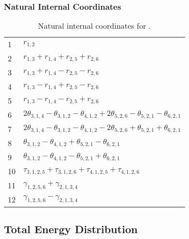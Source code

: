\documentclass[10pt,oneside]{article}
\begin{document}
\begin{table}[h!]
\subsubsection*{Natural Internal Coordinates}
\centering
\caption{Natural internal coordinates for .}
\small
\begin{tabular}{ll}
\toprule
  1   & $r_{1,2}$ \\
  2   & $r_{1,3} + r_{1,4} + r_{2,5} + r_{2,6}$ \\
  3   & $r_{1,3} + r_{1,4} - r_{2,5} - r_{2,6}$ \\
  4   & $r_{1,3} - r_{1,4} + r_{2,5} - r_{2,6}$ \\
  5   & $r_{1,3} - r_{1,4} - r_{2,5} + r_{2,6}$ \\
  6   & $2\theta_{3,1,4} - \theta_{3,1,2} - \theta_{4,1,2} + 2\theta_{5,2,6} - \theta_{5,2,1} - \theta_{6,2,1}$ \\
  7   & $2\theta_{3,1,4} - \theta_{3,1,2} - \theta_{4,1,2} - 2\theta_{5,2,6} + \theta_{5,2,1} + \theta_{6,2,1}$ \\
  8   & $\theta_{3,1,2} - \theta_{4,1,2} + \theta_{5,2,1} - \theta_{6,2,1}$ \\
  9   & $\theta_{3,1,2} - \theta_{4,1,2} - \theta_{5,2,1} + \theta_{6,2,1}$ \\
  10  & $\tau_{3,1,2,5} + \tau_{3,1,2,6} + \tau_{4,1,2,5} + \tau_{4,1,2,6}$ \\
  11  & $\gamma_{1,2,5,6} + \gamma_{2,1,3,4}$ \\
  12  & $\gamma_{1,2,5,6} - \gamma_{2,1,3,4}$ \\
\bottomrule
\end{tabular}
\end{table}

\begin{table}
\subsection*{Total Energy Distribution}
\centering\end{table}

\clearpage

\subsection{}
\end{document}

